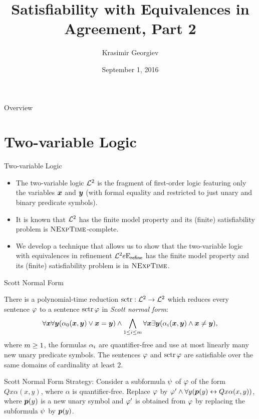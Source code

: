 \documentclass{beamer}
\begin{document}
\title{Satisfiability with Equivalences in Agreement, Part 2}
\author{Krasimir Georgiev}
\date{September 1, 2016}
\frame{\titlepage}

\begin{frame}{Overview}
\tableofcontents
\end{frame}

\section{Two-variable Logic}
\begin{frame}{Two-variable Logic}
\begin{itemize}
  \item 
  The two-variable logic $\mathcal{L}^{2}$ is the fragment of first-order logic featuring
  only the variables $\bm{x}$ and $\bm{y}$ (with formal equality and restricted to just
  unary and binary predicate symbols).

  \item
  It is known that $\mathcal{L}^{2}$ has the finite model property and its (finite)
  satisfiability problem is $\text{\normalfont{\scshape NExpTime}}$-complete.
  
  \item We develop a technique that allows us to show that the two-variable
  logic with equivalences in refinement $\mathcal{L}^{2}{e}\mathrm{E}_{\mathsf{refine}}$ has the finite
  model property and its (finite) satisfiability problem is in $\text{\normalfont{\scshape NExpTime}}$.
\end{itemize}
\end{frame}
\begin{frame}{Scott Normal Form}
\begin{theorem}[Scott]
There is a polynomial-time reduction $\operatorname{sctr}: \mathcal{L}^{2} \to \mathcal{L}^{2}$ which reduces
every sentence $\varphi$ to a sentence $\operatorname{sctr}\varphi$ in \emph{Scott normal form}:
\[
  \forall\bm{x}\forall\bm{y}(\alpha_{0}(\bm{x},\bm{y}) \lor \bm{x} = \bm{y}) \land
  \bigwedge_{1 \leq i \leq m} \forall\bm{x}\exists\bm{y}
  (\alpha_{i}(\bm{x},\bm{y}) \land \bm{x} \neq \bm{y}),
\]
where $m\geq1$, the formulas $\alpha_{i}$ are quantifier-free and use at most
linearly many new unary predicate symbols.
The sentences $\varphi$ and $\operatorname{sctr}\varphi$ are satisfiable over the same domains of
cardinality at least $2$.
\end{theorem}
\end{frame}

\begin{frame}{Scott Normal Form}
Strategy: Consider a subformula $\psi$ of $\varphi$ of the form $Q x
\alpha(x,y)$, where $\alpha$ is quantifier-free.
Replace $\varphi$ by $\varphi' \land \forall y(\bm{p}(y)\leftrightarrow Q x \alpha(x,y))$,
where $\bm{p}(y)$ is a new unary symbol and $\varphi'$ is obtained from $\varphi$ by
replacing the subformula $\psi$ by $\bm{p}(y)$.
\end{frame}
\end{document}
